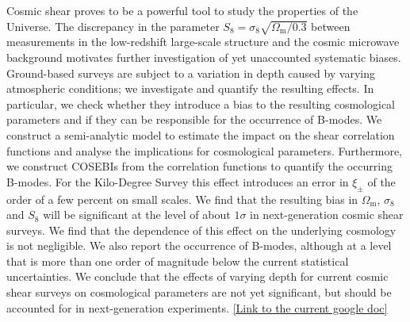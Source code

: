 \documentclass{aa}
\renewcommand{\rm}{\mathrm}
\begin{document}
  \abstract
   {Cosmic shear proves to be a powerful tool to study the properties of the Universe. The discrepancy in the parameter $S_8 = \sigma_8\sqrt{\Omega_{\rm{m}}/0.3}$ between measurements in the low-redshift large-scale structure and the cosmic microwave background motivates further investigation of yet unaccounted systematic biases. 
   Ground-based surveys are subject to a variation in depth caused by varying atmospheric conditions; we investigate and quantify the resulting effects. In particular, we check whether they introduce a bias to the resulting cosmological parameters and if they can be responsible for the occurrence of B-modes.
   We construct a semi-analytic model to estimate the impact on the shear correlation functions and analyse the implications for cosmological parameters. Furthermore, we construct COSEBIs from the correlation functions to quantify the occurring B-modes.
   For the Kilo-Degree Survey this effect introduces an error in $\xi_\pm$ of the order of a few percent on small scales. We find that the resulting bias in $\Omega_{\rm m}$, $\sigma_8$ and $S_8$ will be significant at the level of about $1\sigma$ in next-generation cosmic shear surveys. We find that the dependence of this effect on the underlying cosmology is not negligible. We also report the occurrence of B-modes, although at a level that is more than one order of magnitude below the current statistical uncertainties.
   We conclude that the effects of varying depth for current cosmic shear surveys on cosmological parameters are not yet significant, but should be accounted for in next-generation experiments. \textcolor{blue}{\href{https://docs.google.com/document/d/13j7fUE8jrK5HOVbf4p0HdQs6c14jbWtm9Yq8CtLZCK4/edit?usp=sharing}{[Link to the current google doc]}}}


   \maketitle

%
\end{document}
